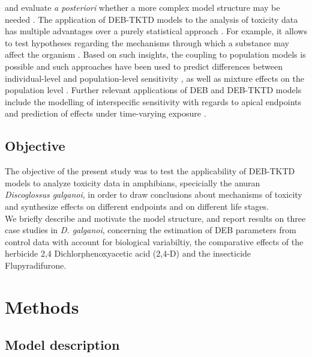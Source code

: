 \documentclass[utf8]{FrontiersinHarvard} %
\begin{document}
and evaluate \textit{a posteriori} whether a more complex model structure may be needed \citep{jagerRevisitingSimplifiedDEBtox2020,efsapanelonplantprotectionproductsandtheirresiduespprScientificOpinionState2018a}. 
% 
The application of DEB-TKTD models to the analysis of toxicity data has multiple advantages over a purely statistical approach \citep{jagerGoodReasonsBan2011,jagerItsTimeMoving2025}. 
For example, it allows to test hypotheses regarding the mechanisms through which a substance may affect the organism 
\citep{kochMakingSenseLifeHistory2021,weighmanUsingDynamicEnergy2023}. 
Based on such insights, the coupling to population models is possible \citep{jagerExtrapolatingToxicEffects2010,martinExtrapolatingEcotoxicologicalEffects2013}
and such approaches have been used to predict differences between individual-level and population-level sensitivity \citep{pereiraUnexpectedAbsenceNickel2019}, 
as well as mixture effects on the population level \citep{vlaeminckPredictingCombinedEffects2022}. Further relevant applications of DEB and DEB-TKTD models 
include the modelling of interspecific sensitivity with regards to apical endpoints \citep{zubrodBioQSARs20Unlocking2024} and prediction of effects 
under time-varying exposure \citep{romoliEnvironmentalRiskAssessment2024a}.
%
\subsection{Objective}
%
The objective of the present study was to test the applicability of DEB-TKTD models to 
analyze toxicity data in amphibians, specicially the anuran \textit{Discoglossus galganoi}, 
in order to draw conclusions about mechanisms of toxicity and synthesize effects 
on different endpoints and on different life stages. \\ 
We briefly describe and motivate the model structure, and report results on three case studies in \textit{D. galganoi}, 
concerning the estimation of DEB parameters from control data with account for biological variabiltiy,
the comparative effects of the herbicide 2,4 Dichlorphenoxyacetic acid (2,4-D) and the insecticide Flupyradifurone.
%
\section{Methods}
%
\subsection{Model description}
%
\end{document}
